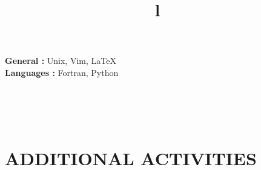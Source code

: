 \documentclass[margin]{res}
\begin{document}
\begin{resume}
\textbf{General : } Unix, Vim, \LaTeX
\\
\textbf{Languages : } Fortran, Python

\begin{format}
\title{l}\\
\\
\body\\
\end{format}

\section{ADDITIONAL ACTIVITIES}




\end{resume}
\(\)
\end{document}
